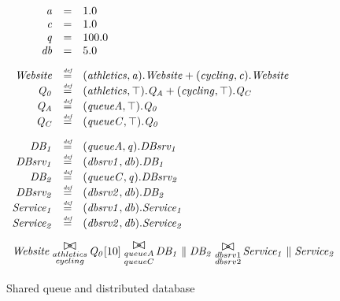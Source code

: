 \documentclass[runningheads]{llncs}
\begin{document}
\begin{figure}
	\centering
	\begin{displaymath}
	\begin{array}{rcl}
	\mathit{a} & = & 1.0\\
	\mathit{c} & = & 1.0\\
	\mathit{q} & = & 100.0\\
	\mathit{db} & = & 5.0\\
	[2.0ex]		\mathit{Website} & \rmdef & (\mathit{athletics},\mathit{a}).\mathit{Website}+(\mathit{cycling},\mathit{c}).\mathit{Website}\\
	\mathit{Q_0} & \rmdef & (\mathit{athletics},\top).\mathit{Q_A}+(\mathit{cycling},\top).\mathit{Q_C}\\
	\mathit{Q_A} & \rmdef & (\mathit{queueA},\top).\mathit{Q_0}\\
	\mathit{Q_C} & \rmdef & (\mathit{queueC},\top).\mathit{Q_0}\\
	[2.0ex]		\mathit{DB_1} & \rmdef & (\mathit{queueA},\mathit{q}).\mathit{DBsrv_1}\\
	\mathit{DBsrv_1} & \rmdef & (\mathit{dbsrv1},\mathit{db}).\mathit{DB_1}\\
	\mathit{DB_2} & \rmdef & (\mathit{queueC},\mathit{q}).\mathit{DBsrv_2}\\
	\mathit{DBsrv_2} & \rmdef & (\mathit{dbsrv2},\mathit{db}).\mathit{DB_2}\\
	\mathit{Service_1} & \rmdef & (\mathit{dbsrv1},\mathit{db}).\mathit{Service_1}\\
	\mathit{Service_2} & \rmdef & (\mathit{dbsrv2},\mathit{db}).\mathit{Service_2}\\
	[2.0ex]		\multicolumn{3}{l}{\mathit{Website}\sync{\substack{athletics\\cycling}}\mathit{Q_0}[10]\sync{\substack{queueA\\queueC}}\mathit{DB_1}\parallel\mathit{DB_2}\sync{\substack{dbsrv1\\dbsrv2}}\mathit{Service_1}\parallel\mathit{Service_2}}\\
	[2.0ex]	\end{array}
	\end{displaymath}
	\caption{Shared queue and distributed database}
	\label{figure:queuedd}
\end{figure}
\end{document}
